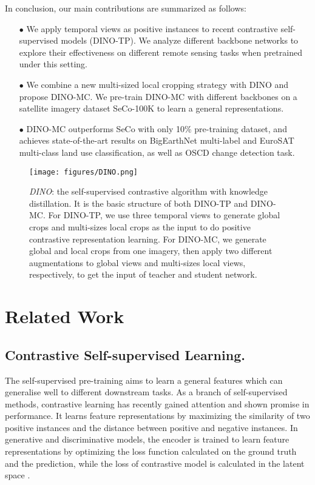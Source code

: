 \documentclass[10pt,twocolumn,letterpaper]{article}
\begin{document}
In conclusion, our main contributions are summarized as follows:
\begin{itemize}
\item[$\bullet$] We apply temporal views as positive instances to recent contrastive self-supervised models (DINO-TP). We analyze different backbone networks to explore their effectiveness on different remote sensing tasks when pretrained under this setting.
\item[$\bullet$] We combine a new multi-sized local cropping strategy with DINO and propose DINO-MC. We pre-train DINO-MC with different backbones on a satellite imagery dataset SeCo-100K to learn a general representations.
\item[$\bullet$] DINO-MC outperforms SeCo with only 10\% pre-training dataset, and achieves state-of-the-art results on BigEarthNet multi-label and EuroSAT multi-class land use classification, as well as OSCD change detection task.
\end{itemize}

\begin{figure*}
  \centering
  \texttt{[image: figures/DINO.png]}
  \caption{
  \textit{DINO}: the self-supervised contrastive algorithm with knowledge distillation.
  It is the basic structure of both DINO-TP and DINO-MC.
  For DINO-TP, we use three temporal views to generate global crops and multi-sizes local crops as the input to do positive contrastive representation learning.
  For DINO-MC, we generate global and local crops from one imagery, then apply two different augmentations to global views and multi-sizes local views, respectively, to get the input of teacher and student network.
  }
  \label{fig:dino}
\end{figure*}

\section{Related Work}
\subsection{Contrastive Self-supervised Learning.}
The self-supervised pre-training aims to learn a general features which can generalise well to different downstream tasks.
As a branch of self-supervised methods, contrastive learning has recently gained attention and shown promise in performance. It learns feature representations by maximizing the similarity of two positive instances and the distance between positive and negative instances.
In generative and discriminative models, the encoder is trained to learn feature representations by optimizing the loss function calculated on the ground truth and the prediction, while the loss of contrastive model is calculated in the latent space \cite{wang2022selfreview}.
\end{document}
